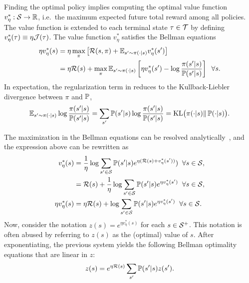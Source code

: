 Finding the optimal policy implies computing the optimal value function ${v^*_\eta:\mathcal{S}\rightarrow\mathbb{R}}$, i.e.~the maximum expected future total reward among all policies. The value function is extended to each terminal state $\tau\in\mathcal{T}$ by defining $v^*_\eta(\tau)\equiv\eta\mathcal{J}(\tau)$. The value function $v^*_\eta$ satisfies the Bellman equations
\begin{align*}
  \eta v^*_\eta(s) &= \eta \max_\pi \left[ \mathcal{R}(s,\pi) + \mathbb{E}_{s'\sim\pi(\cdot|s)} v^*_\eta(s') \right] \\
  &= \eta \mathcal{R}(s) + \max_\pi \mathbb{E}_{s'\sim\pi(\cdot|s)} \left[ \eta v^*_\eta(s') - \log \frac {\pi(s'|s)} {\mathbb{P}(s'|s)} \right] \;\; \forall s.
\end{align*}
In expectation, the regularization term in reduces to the Kullback-Liebler divergence between $\pi$ and $\mathbb{P}$,
\begin{equation*}
  \mathbb{E}_{s'\sim\pi(\cdot|s)} \log \frac {\pi(s'|s)} {\mathbb{P}(s'|s)} = \sum_{s'}\mathbb{P}(s'\lvert s)\log\frac{\pi(s'\lvert s)}{\mathbb{P}(s'\lvert s)} = \mathrm{KL}\big(\pi(\cdot|s)\Vert\, \mathbb{P}(\cdot|s)\big).
\end{equation*}

The maximization in the Bellman equations can be resolved analytically~\citep{Todorov2006}, and the expression above can be rewritten as
\begin{align*}
  v^*_\eta(s)      &=  \frac 1 \eta \log{\sum_{s'\in\mathcal{S}}\mathbb{P}(s'\lvert s)e^{\eta(\mathcal{R}(s) + v^*_\eta(s'))})} \;\;\forall s\in\mathcal{S}, \\
                   &=  \mathcal{R}(s) + \frac 1 \eta \log{\sum_{s'\in\mathcal{S}}\mathbb{P}(s'\lvert s)e^{\eta v^*_\eta(s')}} \;\;\forall s\in\mathcal{S}, \\
  \eta v^*_\eta(s) &=  \eta \mathcal{R}(s) + \log{\sum_{s'\in\mathcal{S}}\mathbb{P}(s'\lvert s)e^{\eta v^*_\eta(s')}} \;\;\forall s\in\mathcal{S}.
\end{align*}
Now, consider the notation $z(s)=e^{\eta v^*_\eta(s)}$ for each $s\in\mathcal{S}^+$. This notation is often abused by referring to $z(s)$ as the (optimal) value of $s$. After exponentiating, the previous system yields the following Bellman optimality equations that are linear in $z$:
\begin{equation}\label{eq:boe_z_lmdp}
z(s) = e^{\eta\mathcal{R}(s)} \sum_{s'}\mathbb{P}(s'|s)z(s').
\end{equation}
